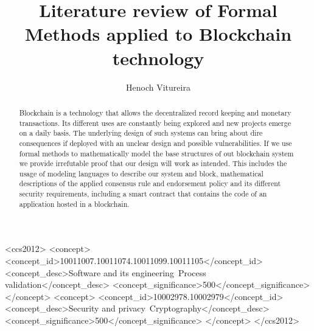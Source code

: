 \documentclass[sigconf, nonacm]{acmart}
\begin{document}
\title{Literature review of Formal Methods applied to Blockchain technology}

\author{Henoch Vitureira}


\renewcommand{\shortauthors}{Henoch Vitureira}

\begin{abstract}
  Blockchain is a technology that allows the decentralized record keeping and monetary transactions.
  Its different uses are constantly being explored and new projects emerge on a daily basis.
  The underlying design of such systems can bring about dire consequences if deployed with an unclear design
  and possible vulnerabilities. If we use formal methods to mathematically model the base structures of out blockchain
  system we provide irrefutable proof that our design will work as intended. This includes the usage of modeling languages
  to describe our system and block, mathematical descriptions of the applied consensus rule and endorsement policy and its different
  security requirements, including a smart contract that contains the code of an application hosted in a blockchain.

\end{abstract}

\begin{CCSXML}
  <ccs2012>
  <concept>
  <concept_id>10011007.10011074.10011099.10011105</concept_id>
  <concept_desc>Software and its engineering~Process validation</concept_desc>
  <concept_significance>500</concept_significance>
  </concept>
  <concept>
  <concept_id>10002978.10002979</concept_id>
  <concept_desc>Security and privacy~Cryptography</concept_desc>
  <concept_significance>500</concept_significance>
  </concept>
  </ccs2012>
\end{CCSXML}

\end{document}
